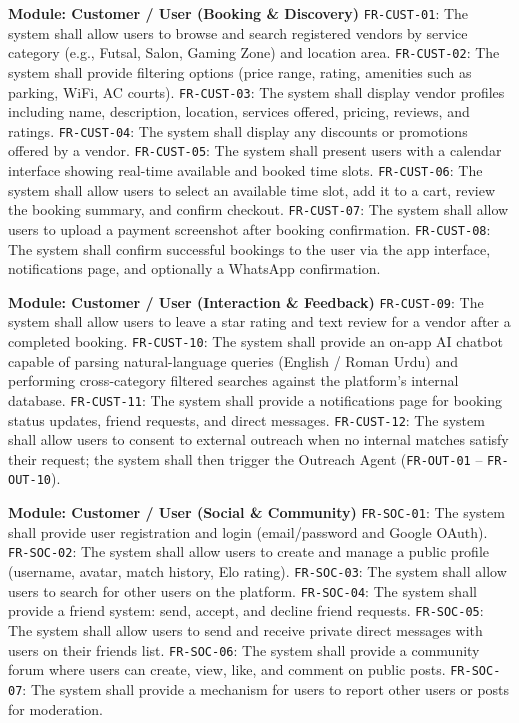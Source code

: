\begin{outline}

  \1 \textbf{Module: Customer / User (Booking \& Discovery)}
  \2 \texttt{FR-CUST-01}: The system shall allow users to browse and search registered
       vendors by service category (e.g., Futsal, Salon, Gaming Zone) and location area.
  \2 \texttt{FR-CUST-02}: The system shall provide filtering options (price range,
       rating, amenities such as parking, WiFi, AC courts).
  \2 \texttt{FR-CUST-03}: The system shall display vendor profiles including name,
       description, location, services offered, pricing, reviews, and ratings.
  \2 \texttt{FR-CUST-04}: The system shall display any discounts or promotions offered
       by a vendor.
  \2 \texttt{FR-CUST-05}: The system shall present users with a calendar interface
       showing real-time available and booked time slots.
  \2 \texttt{FR-CUST-06}: The system shall allow users to select an available time slot,
       add it to a cart, review the booking summary, and confirm checkout.
  \2 \texttt{FR-CUST-07}: The system shall allow users to upload a payment screenshot
       after booking confirmation.
  \2 \texttt{FR-CUST-08}: The system shall confirm successful bookings to the user via
       the app interface, notifications page, and optionally a WhatsApp confirmation.

  \1 \textbf{Module: Customer / User (Interaction \& Feedback)}
  \2 \texttt{FR-CUST-09}: The system shall allow users to leave a star rating and text
       review for a vendor after a completed booking.
  \2 \texttt{FR-CUST-10}: The system shall provide an on-app AI chatbot capable of
       parsing natural-language queries (English / Roman Urdu) and performing
       cross-category filtered searches against the platform's internal database.
  \2 \texttt{FR-CUST-11}: The system shall provide a notifications page for booking
       status updates, friend requests, and direct messages.
  \2 \texttt{FR-CUST-12}: The system shall allow users to consent to external outreach
       when no internal matches satisfy their request; the system shall then trigger the
       Outreach Agent (\texttt{FR-OUT-01} -- \texttt{FR-OUT-10}).

  \1 \textbf{Module: Customer / User (Social \& Community)}
  \2 \texttt{FR-SOC-01}: The system shall provide user registration and login
       (email/password and Google OAuth).
  \2 \texttt{FR-SOC-02}: The system shall allow users to create and manage a public
       profile (username, avatar, match history, Elo rating).
  \2 \texttt{FR-SOC-03}: The system shall allow users to search for other users on
       the platform.
  \2 \texttt{FR-SOC-04}: The system shall provide a friend system: send, accept,
       and decline friend requests.
  \2 \texttt{FR-SOC-05}: The system shall allow users to send and receive private
       direct messages with users on their friends list.
  \2 \texttt{FR-SOC-06}: The system shall provide a community forum where users can
       create, view, like, and comment on public posts.
  \2 \texttt{FR-SOC-07}: The system shall provide a mechanism for users to report
       other users or posts for moderation.


\end{outline}
